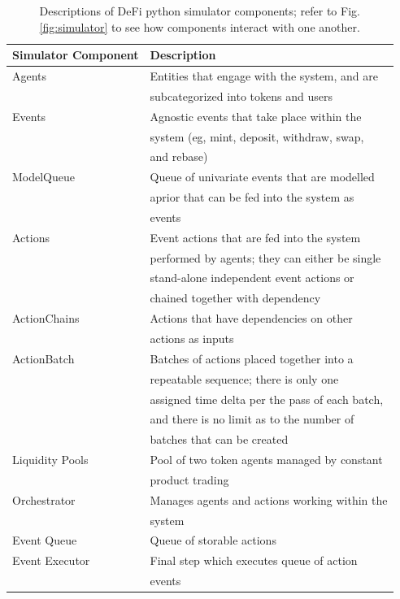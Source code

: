\documentclass[journal,twocolumn,12pt]{ieeesyscoin}
\begin{document}
\begin{table}[h]
\centering
\begin{tabular}{ |l|l| } 
\hline
 \textbf{Simulator Component} & \textbf{Description} \\
\hline
Agents          & Entities that engage with the system, and are  \\
                & subcategorized into tokens and users \\
Events          & Agnostic events that take place within the \\ 
				& system (eg, mint, deposit, withdraw, swap, \\
				& and rebase) \\
ModelQueue      & Queue of univariate events that are modelled \\
				& aprior that can be fed into the system as \\
				& events\\
Actions         & Event actions that are fed into the system \\
				& performed by agents; they can either be single \\
				& stand-alone independent event actions or \\
				& chained together with dependency \\
ActionChains    & Actions that have dependencies on other \\
				& actions as inputs \\				
ActionBatch     & Batches of actions placed together into a \\
				& repeatable sequence; there is only one \\
				& assigned time delta per the pass of each batch, \\
				& and there is no limit as to the number of \\
				& batches that can be created \\
Liquidity Pools & Pool of two token agents managed by constant \\ 
				& product trading \\
Orchestrator    & Manages agents and actions working within the \\ 
				& system \\
Event Queue     & Queue of storable actions \\
Event Executor  & Final step which executes queue of action \\
				& events \\
\hline
\end{tabular}
\caption{Descriptions of DeFi python simulator components; refer to Fig. \ref{fig:simulator} to see how components interact with one another.}
\label{table:simulator_components}
\end{table}
\end{document}
